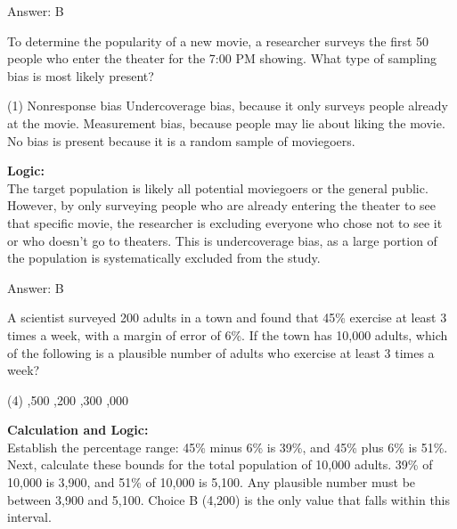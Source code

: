 \documentclass[11pt,paper=a4,answers]{exam}
\begin{document}
\begin{questions}
\begin{solution}
\vspace{30pt}

Answer: \colorbox{yellow!100}{B}
\end{solution}

\vspace{60pt}

\question
To determine the popularity of a new movie, a researcher surveys the first 50 people who enter the theater for the 7:00 PM showing. What type of sampling bias is most likely present?
\begin{tasks}(1)
    \task Nonresponse bias
    \task Undercoverage bias, because it only surveys people already at the movie.
    \task Measurement bias, because people may lie about liking the movie.
    \task No bias is present because it is a random sample of moviegoers.
\end{tasks}

\begin{solution}
\textbf{Logic:} \\
The target population is likely all potential moviegoers or the general public. However, by only surveying people who are already entering the theater to see that specific movie, the researcher is excluding everyone who chose not to see it or who doesn't go to theaters. This is undercoverage bias, as a large portion of the population is systematically excluded from the study.

\vspace{30pt}

Answer: \colorbox{yellow!100}{B}
\end{solution}

\vspace{60pt}

\question
A scientist surveyed 200 adults in a town and found that 45\% exercise at least 3 times a week, with a margin of error of 6\%. If the town has 10,000 adults, which of the following is a plausible number of adults who exercise at least 3 times a week?
\begin{tasks}(4)
    ,500
    ,200
    ,300
    ,000
\end{tasks}

\begin{solution}
\textbf{Calculation and Logic:} \\
Establish the percentage range: 45\% minus 6\% is 39\%, and 45\% plus 6\% is 51\%. Next, calculate these bounds for the total population of 10,000 adults. 39\% of 10,000 is 3,900, and 51\% of 10,000 is 5,100. Any plausible number must be between 3,900 and 5,100. Choice B (4,200) is the only value that falls within this interval.


\end{solution}
\end{questions}
\end{document}
